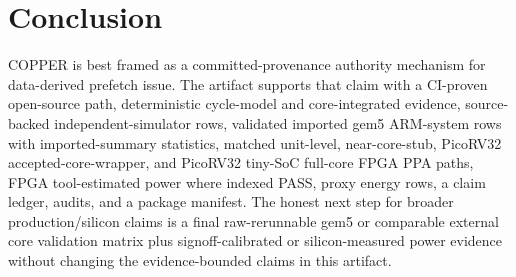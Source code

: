 \documentclass[10pt]{article}
\begin{document}
\section{Conclusion}
COPPER is best framed as a committed-provenance authority mechanism for data-derived prefetch issue. The artifact supports that claim with a CI-proven open-source path, deterministic cycle-model and core-integrated evidence, source-backed independent-simulator rows, validated imported gem5 ARM-system rows with imported-summary statistics, matched unit-level, near-core-stub, PicoRV32 accepted-core-wrapper, and PicoRV32 tiny-SoC full-core FPGA PPA paths, FPGA tool-estimated power where indexed PASS, proxy energy rows, a claim ledger, audits, and a package manifest. The honest next step for broader production/silicon claims is a final raw-rerunnable gem5 or comparable external core validation matrix plus signoff-calibrated or silicon-measured power evidence without changing the evidence-bounded claims in this artifact.



\end{document}
